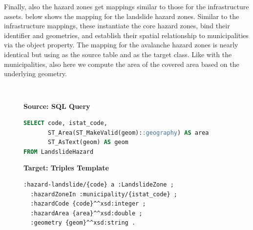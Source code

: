 Finally, also the hazard zones get mappings similar to those for the infrastructure assets.  below shows the mapping for the landslide hazard zones. Similar to the infrastructure mappings, these instantiate the core hazard zones, bind their identifier and geometries, and establish their spatial relationship to municipalities via the  object property. The mapping for the avalanche hazard zones  is nearly identical but using  as the source table and  as the target class. Like with the municipalities, also here we compute the area of the covered area based on the underlying geometry.

\begin{figure}[ht!]
  \vspace*{-1mm}
  \textbf{\small{}} \\
  \begin{minipage}[t]{0.50\textwidth}
    \centering
    \textbf{\scriptsize Source: SQL Query}
\begin{lstlisting}[language=SQL]
SELECT code, istat_code,
       ST_Area(ST_MakeValid(geom)::geography) AS area
       ST_AsText(geom) AS geom
FROM LandslideHazard
\end{lstlisting}
  \end{minipage}
  \hfill
  \begin{minipage}[t]{0.50\textwidth}
    \centering
    \textbf{\scriptsize Target: Triples Template}
\begin{lstlisting}[language=Turtle]
:hazard-landslide/{code} a :LandslideZone ;
  :hazardZoneIn :municipality/{istat_code} ;
  :hazardCode {code}^^xsd:integer ;
  :hazardArea {area}^^xsd:double ;
  :geometry {geom}^^xsd:string . 
\end{lstlisting}
  \end{minipage}
  \vspace*{-4mm}
\end{figure}

